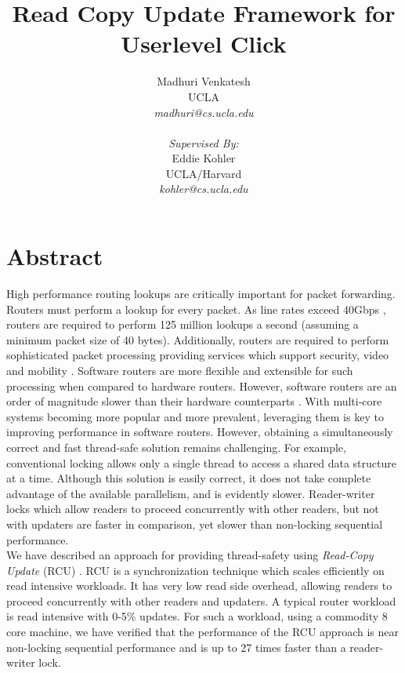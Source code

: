\documentclass[a4paper,marginparwidth=50pt,marginparsep=10pt]{article}
\begin{document}
\author { 
Madhuri Venkatesh 
\\ UCLA 
\\ \textsl{madhuri@cs.ucla.edu}
\\
\\
\textsl{Supervised By:}
\\Eddie Kohler 
\\ UCLA/Harvard
\\ \textsl{kohler@cs.ucla.edu}
}
\title{Read Copy Update Framework for Userlevel Click}
\maketitle

\pagebreak
\section{Abstract}
High performance routing lookups are critically important for packet forwarding. Routers must perform a lookup for every packet. As line rates exceed 40Gbps \cite{attlinkrate}, routers are required to perform 125 million lookups a second (assuming a minimum packet size of 40 bytes). Additionally, routers are required to perform sophisticated packet processing providing services which support security, video and mobility \cite{routebricks}. Software routers are more flexible and extensible for such processing when compared to hardware routers. However, software routers are an order of magnitude slower than their hardware counterparts \cite{cansoftwareroutersscale}. With multi-core systems becoming more popular and more prevalent, leveraging them is key to improving performance in software routers. However, obtaining a simultaneously correct and fast thread-safe solution remains challenging. For example, conventional locking allows only a single thread to access a shared data structure at a time. Although this solution is easily correct, it does not take complete advantage of the available parallelism, and is evidently slower. Reader-writer locks which allow readers to proceed concurrently with other readers, but not with updaters are faster in comparison, yet slower than non-locking sequential performance.\\

We have described an approach for providing thread-safety using \emph{Read-Copy Update} (RCU) \cite{readcopyupdate}. RCU is a synchronization technique which scales efficiently on read intensive workloads. It has very low read side overhead, allowing readers to proceed concurrently with other readers and updaters. A typical router workload is read intensive with 0-5\% updates. For such a workload, using a commodity 8 core machine, we have verified that the performance of the RCU approach is near non-locking sequential performance and is up to 27 times faster than a reader-writer lock.
\end{document}
